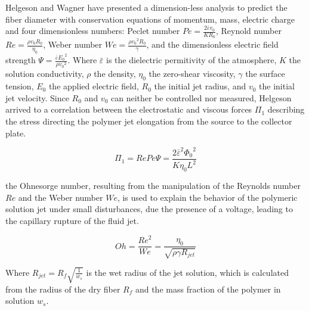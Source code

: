 Helgeson and Wagner \cite{Helgeson2007} have presented a dimension-less analysis to predict the fiber diameter with conservation equations of momentum, mass, electric charge and four dimensionless numbers: Peclet number $ \displaystyle Pe = \frac{2 \bar{\varepsilon} v_0}{K R_0} $, Reynold number $ \displaystyle Re = \frac{\rho v_0 R_0}{\eta_0} $, Weber number $ \displaystyle We = \frac{\rho {v_0}^2 R_0}{\gamma} $, and the dimensionless electric field strength $ \displaystyle \Psi = \frac{\bar{\varepsilon} {E_0}^2}{\rho {v_0}^2} $. Where $\bar{\varepsilon}$ is the dielectric permitivity of the atmosphere, $K$ the solution conductivity, $\rho$ the density, $\eta_0$ the zero-shear viscosity, $\gamma$ the surface tension, $E_0$ the applied electric field, $R_0$ the initial jet radius, and $v_0$ the initial jet velocity. Since $R_0$ and $v_0$ can neither be controlled nor measured, Helgeson arrived to a correlation between the electrostatic and viscous forces $\Pi_1$ describing the stress directing the polymer jet elongation from the source to the collector plate. \cite{Helgeson2007}

\begin{equation}\label{eqn:electroViscousRatio}
    \Pi_1 = Re Pe \Psi = \frac{2 {\bar{\varepsilon}}^2 {\Phi_0}^2}{K \eta_0 L^2}
\end{equation}

the Ohnesorge number, resulting from the manipulation of the Reynolds number $Re$ and the Weber number $We$, is used to explain the behavior of the polymeric solution jet under small disturbances, due the presence of a voltage, leading to the capillary rupture of the fluid jet. \cite{Helgeson2007}

\begin{equation}\label{eqn:ohnesorgeNumber}
    Oh = \frac{{Re}^2}{We} = \frac{\eta_0}{\sqrt{\rho \gamma R_{jet}}}
\end{equation}

Where $ \displaystyle R_{jet} = R_f \sqrt{\frac{1}{w_s}} $ is the wet radius of the jet solution, which is calculated from the radius of the dry fiber $R_f$ and the mass fraction of the polymer in solution $w_s$. \cite{Helgeson2007}


